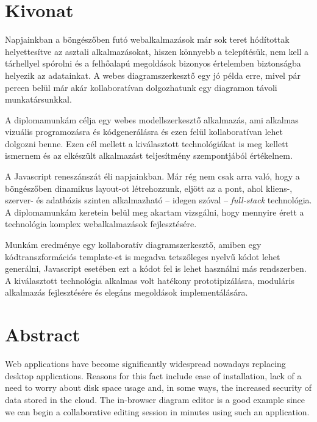 \chapter*{Kivonat}

Napjainkban a böngészőben futó webalkalmazások már sok teret hódítottak helyettesítve az asztali alkalmazásokat, hiszen könnyebb a telepítésük, nem kell a tárhellyel spórolni és a felhőalapú megoldások bizonyos értelemben biztonságba helyezik az adatainkat. A webes diagramszerkesztő egy jó példa erre, mivel pár percen belül már akár kollaboratívan dolgozhatunk egy diagramon távoli munkatársunkkal.

A diplomamunkám célja egy webes modellszerkesztő alkalmazás, ami alkalmas vizuális programozásra és kódgenerálásra és ezen felül kollaboratívan lehet dolgozni benne. Ezen cél mellett a kiválasztott technológiákat is meg kellett ismernem és az elkészült alkalmazást teljesítmény szempontjából értékelnem.

A Javascript reneszánszát éli napjainkban. Már rég nem csak arra való, hogy a böngészőben dinamikus layout-ot létrehozzunk, eljött az a pont, ahol kliens-, szerver- és adatbázis szinten alkalmazható -- idegen szóval -- \emph{full-stack} technológia. A diplomamunkám keretein belül meg akartam vizsgálni, hogy mennyire érett a technológia komplex webalkalmazások fejlesztésére. 

Munkám eredménye egy kollaboratív diagramszerkesztő, amiben egy kódtranszformációs template-et is megadva tetszőleges nyelvű kódot lehet generálni, Javascript esetében ezt a kódot fel is lehet használni más rendszerben. A kiválasztott technológia alkalmas volt hatékony prototipizálásra, moduláris alkalmazás fejlesztésére és elegáns megoldások implementálására.  

\vfill

\chapter*{Abstract}

Web applications have become significantly widespread nowadays replacing desktop applications. Reasons for this fact include ease of installation, lack of a need to worry about disk space usage and, in some ways, the increased security of data stored in the cloud. The in-browser diagram editor is a good example since we can begin a collaborative editing session in minutes using such an application.

